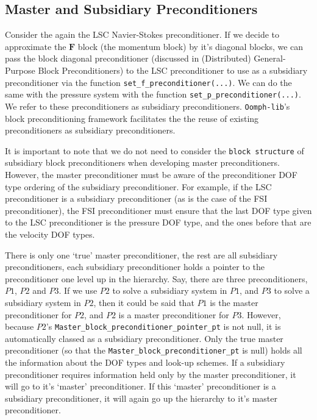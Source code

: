 \subsection{Master and Subsidiary Preconditioners\label{sec:master_and_subsidiary_preconditioners}}
Consider the again the LSC Navier-Stokes preconditioner.
If we decide to approximate the $\mathbf{F}$ block (the momentum block) by it's diagonal blocks, we can pass the block diagonal preconditioner (discussed in (Distributed) General-Purpose Block Preconditioners) to the LSC preconditioner to use as a subsidiary preconditioner via the function \verb+set_f_preconditioner(...)+. We can do the same with the pressure system with the function \verb+set_p_preconditioner(...)+. We refer to these preconditioners as subsidiary preconditioners. \verb+Oomph-lib+'s block preconditioning framework facilitates the the reuse of existing preconditioners as subsidiary preconditioners.

It is important to note that we do not need to consider the \verb+block structure+ of subsidiary block preconditioners when developing master preconditioners. However, the master preconditioner must be aware of the preconditioner DOF type ordering of the subsidiary preconditioner. For example, if the LSC preconditioner is a subsidiary preconditioner (as is the case of the FSI preconditioner), the FSI preconditioner must ensure that the last DOF type given to the LSC preconditioner is the pressure DOF type, and the ones before that are the velocity DOF types.

There is only one `true' master preconditioner, the rest are all subsidiary preconditioners, each subsidiary preconditioner holds a pointer to the preconditioner one level up in the hierarchy. Say, there are three preconditioners, $P1$, $P2$ and $P3$. If we use $P2$ to solve a subsidiary system in $P1$, and $P3$ to solve a subsidiary system in $P2$, then it could be said that $P1$ is the master preconditioner for $P2$, and $P2$ is a master preconditioner for $P3$. However, because $P2$'s \verb+Master_block_preconditioner_pointer_pt+ is not null, it is automatically classed as a subsidiary preconditioner. Only the true master preconditioner (so that the \verb+Master_block_preconditioner_pt+ is null) holds all the information about the DOF types and look-up schemes. If a subsidiary preconditioner requires information held only by the master preconditioner, it will go to it's `master' preconditioner. If this `master' preconditioner is a subsidiary preconditioner, it will again go up the hierarchy to it's master preconditioner.


